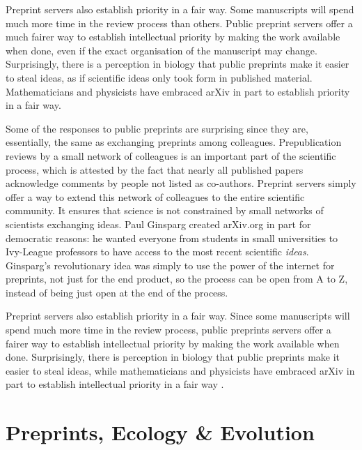 \documentclass[letterpaper,twocolumn,superscriptaddress,showkeys]{revtex4}
\begin{document}
Preprint servers also establish priority in a fair way.  Some manuscripts will
spend much more time in the review process than others.  Public preprint servers
offer a much fairer way to establish intellectual priority by making the work
available when done, even if the exact organisation of the manuscript may
change. Surprisingly, there is a perception in biology that public preprints
make it easier to steal ideas, as if scientific ideas only took form in
published material.  Mathematicians and physicists have embraced arXiv in part
to establish priority in a fair way\cite{cal12}.

Some of the responses to public preprints are surprising since they are,
essentially, the same as exchanging preprints among colleagues.  Prepublication
reviews by a small network of colleagues is an important part of the scientific
process, which is attested by the fact that nearly all published papers
acknowledge comments by people not listed as co-authors.  Preprint servers
simply offer a way to extend this network of colleagues to the entire scientific
community. It ensures that science is not constrained by small networks of
scientists exchanging ideas.  Paul Ginsparg created arXiv.org in part for
democratic reasons: he wanted everyone from students in small universities to
Ivy-League professors to have access to the most recent scientific \emph{ideas}.
Ginsparg's revolutionary idea was simply to use the power of the internet for
preprints, not just for the end product, so the process can be open from A to Z,
instead of being just open at the end of the process.

Preprint servers also establish priority in a fair way. Since some manuscripts
will spend much more time in the review process, public preprints servers offer
a fairer way to establish intellectual priority by making the work available
when done. Surprisingly, there is perception in biology that public preprints
make it easier to steal ideas, while mathematicians and physicists have embraced
arXiv in part to establish intellectual priority in a fair way \cite{cal12}.

\section{Preprints, Ecology \& Evolution}
\end{document}

